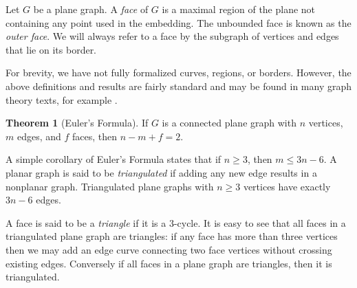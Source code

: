 \documentclass[letterpaper, 12pt]{article}
\theoremstyle{definition}
\theoremstyle{definition}
\theoremstyle{thm}
\newtheorem{theorem}{Theorem}[section]
\theoremstyle{definition}
\begin{document}
Let $G$ be a plane graph. A \textit{face} of $G$ is a maximal region
of the plane not containing any point used in the embedding. The unbounded face
is known as the \textit{outer face}. We will always refer to a face by the
subgraph of vertices and edges that lie on its border.

For brevity, we have
not fully formalized curves, regions, or borders. However, the
above definitions and results are fairly standard and may be found in many graph
theory texts, for example \cite{west}.

\begin{theorem}[Euler's Formula]
If $G$ is a connected plane graph with $n$ vertices, $m$ edges, and $f$ faces,
then $n-m+f=2$.
\end{theorem}

A simple corollary of Euler's Formula states that if $n\ge 3$, then $m\le 3n-6$.
A planar graph is said to be \textit{triangulated} if adding any new edge
results in a nonplanar graph. Triangulated plane graphs with $n\ge 3$ vertices
have exactly $3n-6$ edges.

A face is said to be a \textit{triangle} if it is a
$3$-cycle. It is easy to see that all faces in a triangulated
plane graph are triangles: if any face has more than three vertices then we may
add an edge curve connecting two face vertices without crossing existing edges.
Conversely if all faces in a plane graph are triangles, then it is triangulated.

\begin{comment}
\begin{figure}
\begin{tikzpicture}
	\node (a) at (0.75cm,0.75cm) {};
	\node (b) at (0.75cm,-0.75cm) {};
	\node (c) at (-0.75cm,-0.75cm) {};
	\node (d) at (-0.75cm,0.75cm) {};
	\node [draw=none, fill=none] (1) at (0cm,-1cm) {};
	\node [draw=none, fill=none] (2) at (0cm,1cm) {};
	\draw (a) -- (b) -- (c) -- (d) -- (a);
	\draw (a) -- (c); \draw (b) -- (d);
\end{tikzpicture}
$\qquad$
\begin{tikzpicture}
	\node (a) at (0cm,0.75cm) {};
	\node (b) at (0.866cm,-0.75cm) {};
	\node (c) at (-0.866cm,-0.75cm) {};
	\node (d) at (0cm, -0.18cm) {};
	\node [draw=none, fill=none] (1) at (0cm,-1cm) {};
	\node [draw=none, fill=none] (2) at (0cm,1cm) {};
	\draw (a) -- (b) -- (c) -- (d) -- (a);
	\draw (a) -- (c); \draw (b) -- (d);
\end{tikzpicture}

\caption{A nonplanar drawing and a planar embedding of $K_4$.}
\end{figure}
\end{comment}
\end{document}
